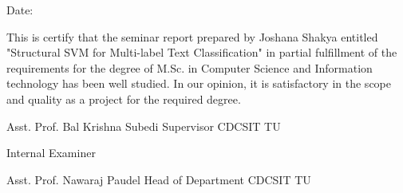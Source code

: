 \vspace{1cm}

\begin{flushright}
	Date: \dottedline{4cm}
\end{flushright}

\vspace{1cm}

This is certify that the seminar report prepared by Joshana Shakya entitled "Structural SVM for Multi-label Text Classification" in partial fulfillment of the requirements for the degree of M.Sc. in Computer Science and Information technology has been well studied. In our opinion, it is satisfactory in the scope and quality as a project for the required degree. 

\vspace{2cm}

\begin{flushleft}
	\dottedline{5.8cm} \newline
	Asst. Prof. Bal Krishna Subedi \newline
	Supervisor \newline
	CDCSIT \newline
	TU \newline
\end{flushleft}

\vspace{2cm}

\begin{flushleft}
	\dottedline{5.8cm} \newline
	Internal Examiner
\end{flushleft}

\vspace{2cm}

\begin{flushleft}
	\dottedline{5.8cm} \newline       
	Asst. Prof. Nawaraj Paudel \newline
	Head of Department
	CDCSIT \newline
	TU \newline
\end{flushleft}

\clearpage